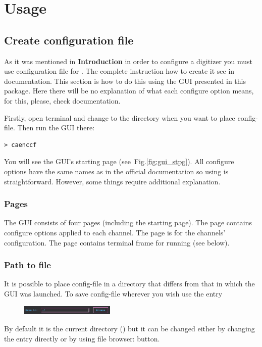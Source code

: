 \section{Usage}
\subsection{Create configuration file}
As it was mentioned in \textbf{Introduction} in order to configure a digitizer you must
use configuration file for . The complete instruction how to create it see in
 documentation. This section is how to do this using the GUI presented in this
package. Here there will be no explanation of what each configure option means, for this,
please, check  documentation.

Firstly, open terminal and change to the directory when you want to place config-file.
Then run the GUI there:
\begin{lstlisting}
> caenccf
\end{lstlisting}
You will see the GUI's starting page (see~Fig.\ref{fig:gui_stpg}).
All configure options have the same names as in the official  documentation so
using is straightforward. However, some things require additional explanation. 
\subsubsection*{Pages}
The GUI consists of four pages (including the starting page). The 
page contains configure options applied to each channel. The 
page is for the channels' configuration. The  page contains terminal
frame for running  (see below).
\subsubsection*{Path to file}
It is possible to place config-file in a directory that differs from that in which the
GUI was launched. To save config-file wherever you wish use the  entry

\begin{figure}[H]
    \centering
    \includegraphics[width=0.4\textwidth]{../pictures/documentation/gui/browser.png}
\end{figure}

By default it is the current directory () but it can be changed either by
changing the entry directly or by using file browser:   button.

